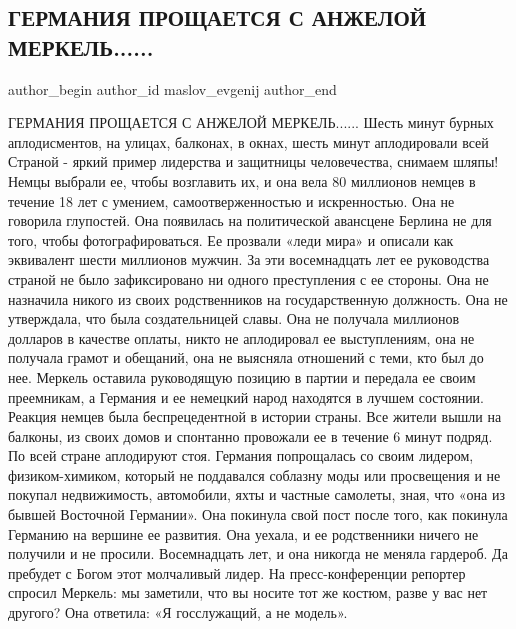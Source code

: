 
 
 
 
 
 
\subsection{ГЕРМАНИЯ ПРОЩАЕТСЯ С АНЖЕЛОЙ МЕРКЕЛЬ......}
\label{sec:08_06_2021.fb.maslov_evgenij.1.merkel_angela_germania_proschanie}
\ifcmt
 author_begin
   author_id maslov_evgenij
 author_end
\fi

ГЕРМАНИЯ ПРОЩАЕТСЯ С АНЖЕЛОЙ МЕРКЕЛЬ......
Шесть минут бурных аплодисментов, на улицах, балконах, в окнах, шесть минут аплодировали всей Страной - яркий пример лидерства и защитницы человечества, снимаем шляпы!
Немцы выбрали ее, чтобы возглавить их, и она вела 80 миллионов немцев в течение 18 лет с умением, самоотверженностью и искренностью. Она не говорила глупостей. Она появилась на политической авансцене Берлина не для того, чтобы фотографироваться. Ее прозвали «леди мира» и описали как эквивалент шести миллионов мужчин.
За эти восемнадцать лет ее руководства страной не было зафиксировано ни одного преступления с ее стороны. Она не назначила никого из своих родственников на государственную должность. Она не утверждала, что была создательницей славы. Она не получала миллионов долларов в качестве оплаты, никто не аплодировал ее выступлениям, она не получала грамот и обещаний, она не выясняла отношений с теми, кто был до нее.
Меркель оставила руководящую позицию в партии и передала ее своим преемникам, а Германия и ее немецкий народ находятся в лучшем состоянии.
Реакция немцев была беспрецедентной в истории страны. Все жители вышли на балконы, из своих домов и спонтанно провожали ее в течение 6 минут подряд. По всей стране аплодируют стоя.
Германия попрощалась со своим лидером, физиком-химиком, который не поддавался соблазну моды или просвещения и не покупал недвижимость, автомобили, яхты и частные самолеты, зная, что «она из бывшей Восточной Германии».
Она покинула свой пост после того, как покинула Германию на вершине ее развития. Она уехала, и ее родственники ничего не получили и не просили. Восемнадцать лет, и она никогда не меняла гардероб. Да пребудет с Богом этот молчаливый лидер.
На пресс-конференции репортер спросил Меркель: мы заметили, что вы носите тот же костюм, разве у вас нет другого? Она ответила: «Я госслужащий, а не модель».

